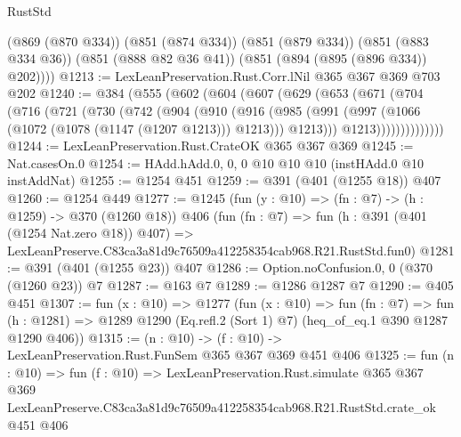 \begin{lexlean}{RustStd}
\begin{coremodule}
        (@869 (@870 @334))
        (@851 (@874 @334))
        (@851 (@879 @334))
        (@851 (@883 @334 @36))
        (@851 (@888 @82 @36 @41))
        (@851 (@894 (@895 (@896 @334)) @202))))
@1213 := LexLeanPreservation.Rust.Corr.lNil @365 @367 @369 @703 @202
@1240 := @384
    (@555
      (@602
        (@604
          (@607
            (@629
              (@653
                (@671
                  (@704
                    (@716
                      (@721
                        (@730
                          (@742
                            (@904
                              (@910
                                (@916
                                  (@985
                                    (@991
                                      (@997 (@1066 (@1072 (@1078 (@1147 (@1207 @1213))) @1213)))
                                      @1213)))
                                @1213))))))))))))))
@1244 := LexLeanPreservation.Rust.CrateOK @365 @367 @369
@1245 := Nat.casesOn.{0}
@1254 := HAdd.hAdd.{0, 0, 0} @10 @10 @10 (instHAdd.{0} @10 instAddNat)
@1255 := @1254 @451
@1259 := @391 (@401 (@1255 @18)) @407
@1260 := @1254 @449
@1277 := @1245
    (fun (y : @10) => (fn : @7) -> (h : @1259) -> @370 (@1260 @18))
    @406
    (fun (fn : @7) =>
    fun (h : @391 (@401 (@1254 Nat.zero @18)) @407) =>
    LexLeanPreserve.C83ca3a81d9c76509a412258354cab968.R21.RustStd.fun0)
@1281 := @391 (@401 (@1255 @23)) @407
@1286 := Option.noConfusion.{0, 0} (@370 (@1260 @23)) @7
@1287 := @163 @7
@1289 := @1286 @1287 @7
@1290 := @405 @451
@1307 := fun (x : @10) =>
  @1277
    (fun (x : @10) =>
    fun (fn : @7) =>
    fun (h : @1281) => @1289 @1290 (Eq.refl.{2} (Sort 1) @7) (heq_of_eq.{1} @390 @1287 @1290 @406))
@1315 := (n : @10) -> (f : @10) -> LexLeanPreservation.Rust.FunSem @365 @367 @369 @451 @406
@1325 := fun (n : @10) =>
  fun (f : @10) =>
  LexLeanPreservation.Rust.simulate
    @365
    @367
    @369
    LexLeanPreserve.C83ca3a81d9c76509a412258354cab968.R21.RustStd.crate_ok
    @451
    @406
\end{coremodule}
\end{lexlean}

